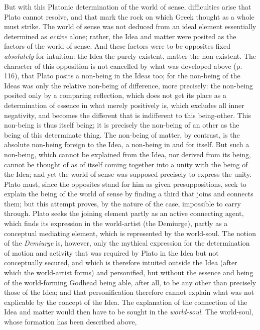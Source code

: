 But with this Platonic determination of the world of sense, difficulties arise that Plato
cannot resolve, and that mark the rock on which Greek thought as a whole must strike. The
world of sense was not deduced from an ideal element essentially determined as
\emph{active} alone; rather, the Idea and matter were posited as the factors of the world
of sense. And these factors were to be opposites fixed \emph{absolutely} for intuition: the
Idea the purely existent, matter the non-existent. The character of this opposition is not
cancelled by what was developed above (p. 116), that Plato posits a non-being in the Ideas
too; for the non-being of the Ideas was only the relative non-being of difference, more
precisely: the non-being posited only by a comparing reflection, which does not get its
place as a determination of essence in what merely positively is, which excludes all inner
negativity, and becomes the different that is indifferent to this being-other. This
non-being is thus itself being; it is precisely the non-being of an other as the being of
this determinate thing. The non-being of matter, by contrast, is the absolute non-being
foreign to the Idea, a non-being in and for itself. But such a non-being, which cannot be
explained from the Idea, nor derived from its being, cannot be thought of as of itself
coming together into a unity with the being of the Idea; and yet the world of sense was
supposed precisely to express the unity. Plato must, since the opposites stand for him as
given presuppositions, seek to explain the being of the world of sense by finding a third
that joins and connects them; but this attempt proves, by the nature of the case,
impossible to carry through. Plato seeks the joining element partly as an active
connecting agent, which finds its expression in the world-artist (the Demiurge), partly as
a conceptual mediating element, which is represented by the world-soul. The notion of the
\emph{Demiurge} is, however, only the mythical expression for the determination of motion
and activity that was required by Plato in the Idea but not conceptually
secured, and which is therefore intuited outside the Idea (after which the world-artist
forms) and personified, but without the essence and being of the world-forming Godhead
being able, after all, to be any other than precisely those of the Idea; and that
personification therefore cannot explain what was not explicable by the concept of the
Idea. The explanation of the connection of the Idea and matter would then have to be sought
in the \emph{world-soul}. The world-soul, whose formation has been described above,

